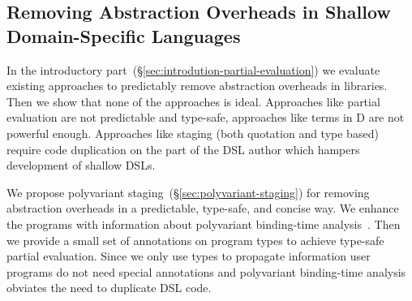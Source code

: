 %
%



\subsection{Removing Abstraction Overheads in Shallow Domain-Specific Languages}


 In the introductory part~(\S \ref{sec:introdution-partial-evaluation}) we evaluate existing approaches
  to predictably remove abstraction overheads in libraries. Then we show that none of
  the approaches is ideal. Approaches like partial evaluation are not predictable and type-safe,
  approaches like  terms in D are not powerful enough. Approaches like staging (both quotation and type based)
  require code duplication on the part of the DSL author which hampers development of shallow DSLs.

We propose polyvariant staging~(\S \ref{sec:polyvariant-staging}) for removing abstraction
 overheads in a predictable, type-safe, and concise way. We enhance the programs with
 information about polyvariant binding-time analysis~\cite{rytz1992polyvariant}. Then we provide
  a small set of annotations on program types to achieve type-safe partial evaluation.
  Since we only use types to propagate information user programs do not need special annotations
  and polyvariant binding-time analysis obviates the need to duplicate DSL code.



